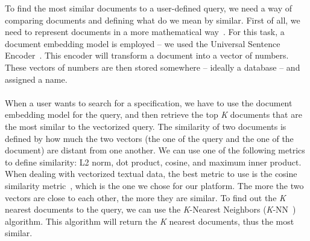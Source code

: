 To find the most similar documents to a user-defined query, we need a way of comparing documents and defining what do we mean by similar.
First of all, we need to represent documents in a more mathematical way~\cite{dai_document_2015}.
For this task, a document embedding model is employed -- we used the Universal Sentence Encoder~\cite{cer_universal_2018}.
This encoder will transform a document into a vector of numbers.
These vectors of numbers are then stored somewhere -- ideally a database -- and assigned a name. \\ \\
When a user wants to search for a specification, we have to use the document embedding model for the query, and then retrieve the top \textit{K} documents that are the most similar to the vectorized query.
The similarity of two documents is defined by how much the two vectors (the one of the query and the one of the document) are distant from one another.
We can use one of the following metrics to define similarity: L2 norm, dot product, cosine, and maximum inner product.
When dealing with vectorized textual data, the best metric to use is the cosine similarity metric~\cite{guo_testing_2022}, which is the one we chose for our platform.
The more the two vectors are close to each other, the more they are similar.
To find out the \textit{K} nearest documents to the query, we can use the \textit{K}-Nearest Neighbors (\textit{K}-NN~\cite{cover_nearest_1967}) algorithm.
This algorithm will return the \textit{K} nearest documents, thus the most similar.

